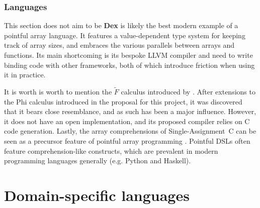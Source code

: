 \subsubsection{Languages}

This section does not aim to be  \textbf{Dex} is likely the best modern example of a pointful array language. It features a value-dependent type system for keeping track of array sizes, and embraces the various parallels between arrays and functions. Its main shortcoming is its bespoke LLVM compiler and need to write binding code with other frameworks, both of which introduce friction when using it in practice.

It is worth is worth to mention the $\tilde{F}$ calculus introduced by \textcite{shaikhha2019efficient}. After extensions to the Phi calculus introduced in the proposal for this project, it was discovered that it bears close resemblance, and as such has been a major influence. However, it does not have an open implementation, and its proposed compiler relies on C code generation. Lastly, the array comprehensions of Single-Assignment~C can be seen as a precursor feature of pointful array programming \cite{scholz1994single}. Pointful DSLs often feature comprehension-like constructs, which are prevalent in modern programming languages generally (e.g. Python and Haskell). 






\section{Domain-specific languages}

